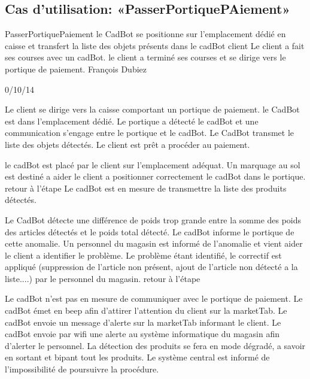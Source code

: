 ﻿%
\subsection{Cas d'utilisation: «PasserPortiquePAiement» }

\startCU
\nom PasserPortiquePaiement
\but le CadBot se positionne sur l'emplacement dédié en caisse et transfert la liste des objets présents dans le cadBot
\acteur client
\precondition Le client a fait ses courses avec un cadBot.
\declenchement le client a terminé ses courses et se dirige vers le portique de paiement.
\auteur François Dubiez
\date 30/10/14

\nominal %
\startnominal
\etape[SA1] Le client se dirige vers la caisse comportant un portique de paiement.
\etape[RETOUR] le CadBot est dans l'emplacement dédié. Le portique a détecté le cadBot et une communication s'engage entre le portique et le cadBot.
\etape[SA2] Le CadBot transmet le liste des objets détectés.
\stopnominal
\postcondition Le client est prêt a procéder au paiement.

\alternatifs %
\startalternatif[SA1] %
\startcondition[ModeManuel] 
  \etape le cadBot est placé par le client sur l'emplacement adéquat.
  \etape  Un marquage au sol est destiné a aider le client a positionner correctement le cadBot dans le portique.
  \etape retour à l'étape \in[RETOUR]
\stopcondition
\postcondition Le cadBot est en mesure de transmettre la liste des produits détectés.
\stopalternatif

\startalternatif[SA2]
  \etape Le CadBot détecte une différence de poids trop grande entre la somme des poids des articles détectés et le poids total détecté.
  \etape Le cadBot informe le portique de cette anomalie.
  \etape Un personnel du magasin est informé de l'anomalie et vient aider le client a identifier le problème.
  \etape Le problème étant identifié, le correctif est appliqué (suppression de l'article non présent, ajout de l'article non détecté a la liste....) par le personnel du magasin.
  \etape retour à l'étape \in[RETOUR2]
\stopcondition
\stopalternatif

\exception %
\startalternatif[RETOUR] 
  \etape Le cadBot n'est pas en mesure de communiquer avec le portique de paiement.
  \etape Le cadBot émet en beep afin d'attirer l'attention du client sur la marketTab.
  \etape Le cadBot envoie un message d'alerte sur la marketTab informant le client.
  \etape Le cadBot envoie par wifi une alerte au système informatique du magasin afin d'alerter le personnel.
 \etape La détection des produits se fera en mode dégradé, a savoir en sortant et bipant tout les produits.
\stopcondition
\postcondition Le système central est informé de l'impossibilité de poursuivre la procédure.
\stopalternatif
\stopCU
